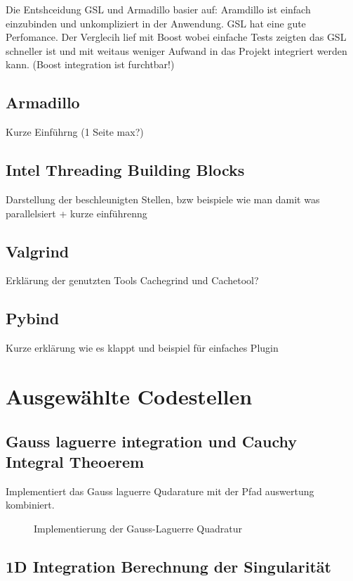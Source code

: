 Die Entshceidung GSL und Armadillo basier auf: Aramdillo ist einfach einzubinden und unkompliziert in der Anwendung.
GSL hat eine gute Perfomance. Der Verglecih lief mit Boost wobei einfache Tests zeigten das GSL schneller ist und mit weitaus weniger Aufwand in das Projekt integriert werden kann.
(Boost integration ist furchtbar!)


\subsection{Armadillo}

Kurze Einführng (1 Seite max?)

\subsection{Intel Threading Building Blocks}

Darstellung der beschleunigten Stellen, bzw beispiele wie man damit was parallelsiert + kurze einführenng

\subsection{Valgrind}

Erklärung der genutzten Tools Cachegrind und Cachetool?

\subsection{Pybind}

Kurze erklärung wie es klappt und beispiel für einfaches Plugin


\section{Ausgewählte Codestellen}

\subsection{Gauss laguerre integration und Cauchy Integral Theoerem}

Implementiert das Gauss laguerre Qudarature mit der Pfad auswertung kombiniert.

\begin{figure}
    
    \caption{Implementierung der Gauss-Laguerre Quadratur}
\end{figure}
\subsection{1D Integration Berechnung der Singularität}

